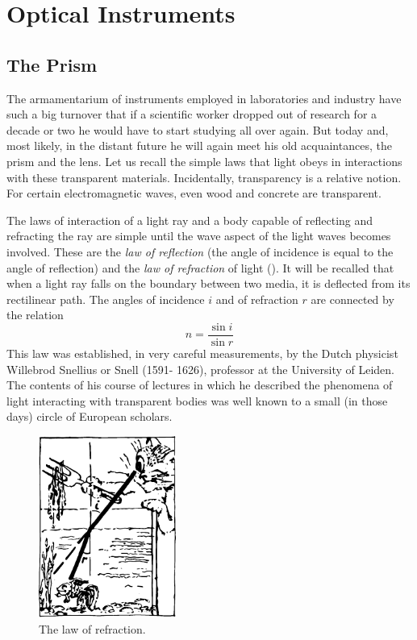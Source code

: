 

\cleardoublepage
\chapter{Optical Instruments}
\label{ch-02}

\section{The Prism}
The armamentarium of instruments employed in labor­atories and industry have such a big turnover that if a scientific worker dropped out of research for a decade or two he would have to start studying all over again. But today and, most likely, in the distant future he will again meet his old acquaintances, the prism and the lens. Let us recall the simple laws that light obeys in interactions with these transparent materials. Incidental­ly, transparency is a relative notion. For certain electromagnetic waves, even wood and concrete are transparent.

The laws of interaction of a light ray and a body ca­pable of reflecting and refracting the ray are simple until the wave aspect of the light waves becomes involved. These are the \emph{law of reflection} (the angle of incidence is equal to the angle of reflection) and the \emph{law of refraction} of light (). It will be recalled that when a light ray falls on the boundary between two media, it is deflected from its recti­linear path. The angles of incidence $i$ and of refraction $r$ are connected by the relation
\begin{equation*}%
n = \frac{\sin i}{\sin r}
\end{equation*}
This law was established, in very careful measurements, by the Dutch physicist Willebrod Snellius or Snell (1591- 1626), professor at the University of Leiden. The contents of his course of lectures in which he described the phenomena of light interacting with transparent bodies was well known to a small (in those days) circle of European scholars.

\begin{figure}[!ht]
\centering
\includegraphics[width=0.4\textwidth]{figures/fig-02-01.pdf}
\caption{The law of refraction.}
\label{fig-2.1}
\end{figure}

